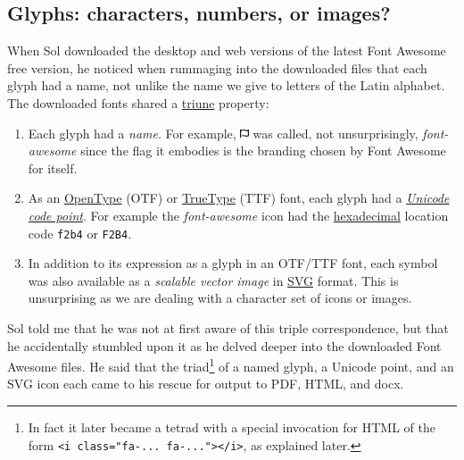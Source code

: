 \documentclass[
  british,
  a4paper,
  rgb,
  dvipsnames,
  svgnames,
  hyphens]{article}
\begin{document}
\hypertarget{glyphs-characters-numbers-or-images}{%
\subsection{Glyphs: characters, numbers, or
images?}\label{glyphs-characters-numbers-or-images}}

When Sol downloaded the desktop and web versions of the latest Font
Awesome free version, he noticed when rummaging into the downloaded
files that each glyph had a name, not unlike the name we give to letters
of the Latin alphabet. The downloaded fonts shared a
\href{https://www.collinsdictionary.com/dictionary/english/triune}{triune}
property:

\begin{enumerate}
\item
  Each glyph had a \emph{name}. For example,
  \includegraphics[width=0.02\textwidth,height=\textheight]{images/font-awesome.svg}
  was called, not unsurprisingly, \emph{font-awesome} since the flag it
  embodies is the branding chosen by Font Awesome for itself.
\item
  As an \href{https://en.wikipedia.org/wiki/OpenType}{OpenType} (OTF) or
  \href{https://en.wikipedia.org/wiki/TrueType}{TrueType} (TTF) font,
  each glyph had a
  \href{https://en.wikipedia.org/wiki/Code_point}{\emph{Unicode code
  point}}. For example the \emph{font-awesome} icon had the
  \href{https://en.wikipedia.org/wiki/Hexadecimal}{hexadecimal} location
  code \texttt{f2b4} or \texttt{F2B4}.
\item
  In addition to its expression as a glyph in an OTF/TTF font, each
  symbol was also available as a \emph{scalable vector image} in
  \href{https://developer.mozilla.org/en-US/docs/Web/SVG}{SVG} format.
  This is unsurprising as we are dealing with a character set of icons
  or images.
\end{enumerate}

Sol told me that he was not at first aware of this triple
correspondence, but that he accidentally stumbled upon it as he delved
deeper into the downloaded Font Awesome files. He said that the
triad\footnote{In fact it later became a tetrad with a special
  invocation for HTML of the form
  \texttt{\textless{}i\ class="fa-...\ fa-..."\textgreater{}\textless{}/i\textgreater{}},
  as explained later.} of a named glyph, a Unicode point, and an SVG
icon each came to his rescue for output to PDF, HTML, and docx.
\end{document}
